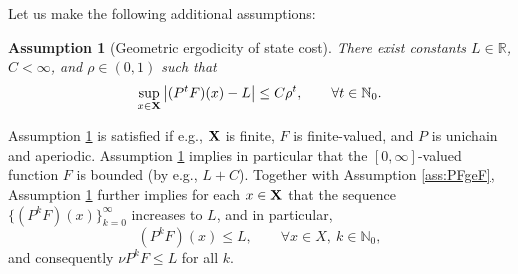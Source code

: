 \documentclass[letterpaper,10pt,conference]{ieeeconf}  %
\newtheorem{assumption}{Assumption}
\begin{document}
Let us make the following additional assumptions:


\begin{assumption}[Geometric ergodicity of state cost]
\label{ass:UniGeo}
There exist constants $L\in\mathbb R$, $C<\infty$, and $\rho\in(0,1)$ such that
\begin{equation}
\label{eq:A2_geo}
\sup_{x\in {{\bf X}}}\big|(P^tF)(x)-L\big|\le C\rho^t,\qquad \forall t\in\mathbb N_0.
\end{equation}
\end{assumption}
Assumption \ref{ass:UniGeo} is satisfied if e.g., ${\bf X}$ is finite, $F$ is finite-valued, and $P$ is unichain and aperiodic.  
{Assumption \ref{ass:UniGeo} implies in particular that the $[0,\infty]$-valued function $F$ is bounded (by e.g., $L+C$). Together with Assumption \ref{ass:PFgeF}, Assumption \ref{ass:UniGeo} further implies for each $x\in {\bf X}$ that the sequence $\{(P^kF)(x)\}_{k=0}^\infty$ increases to $L$, and in particular,
\begin{equation}\label{eq:PkF_le_L}
(P^kF)(x)\le L,\qquad \forall x\in X,\ k\in\mathbb N_0,
\end{equation}
and consequently $\nu P^kF\le L$ for all $k$.}
 
\end{document}
